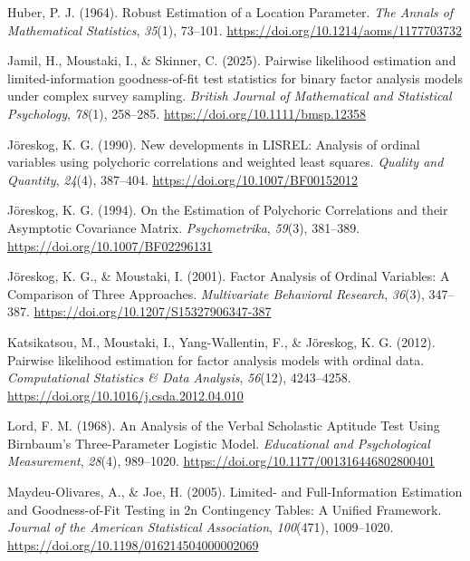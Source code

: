 \documentclass[
  letterpaper,
  DIV=11,
  numbers=noendperiod]{scrartcl}
\newlength{\cslhangindent}
\newenvironment{CSLReferences}[2] %
 {\begin{list}{}{%
  \setlength{\itemindent}{0pt}
  \setlength{\leftmargin}{0pt}
  \setlength{\parsep}{0pt}
  \ifodd #1
   \setlength{\leftmargin}{\cslhangindent}
   \setlength{\itemindent}{-1\cslhangindent}
  \fi
  \setlength{\itemsep}{#2\baselineskip}}}
 {\end{list}}
\begin{document}
\begin{CSLReferences}{1}{0}
Huber, P. J. (1964). Robust {Estimation} of a {Location Parameter}.
\emph{The Annals of Mathematical Statistics}, \emph{35}(1), 73--101.
\url{https://doi.org/10.1214/aoms/1177703732}

Jamil, H., Moustaki, I., \& Skinner, C. (2025). Pairwise likelihood
estimation and limited-information goodness-of-fit test statistics for
binary factor analysis models under complex survey sampling.
\emph{British Journal of Mathematical and Statistical Psychology},
\emph{78}(1), 258--285. \url{https://doi.org/10.1111/bmsp.12358}

Jöreskog, K. G. (1990). New developments in {LISREL}: Analysis of
ordinal variables using polychoric correlations and weighted least
squares. \emph{Quality and Quantity}, \emph{24}(4), 387--404.
\url{https://doi.org/10.1007/BF00152012}

Jöreskog, K. G. (1994). On the {Estimation} of {Polychoric Correlations}
and their {Asymptotic Covariance Matrix}. \emph{Psychometrika},
\emph{59}(3), 381--389. \url{https://doi.org/10.1007/BF02296131}

Jöreskog, K. G., \& Moustaki, I. (2001). Factor {Analysis} of {Ordinal
Variables}: {A Comparison} of {Three Approaches}. \emph{Multivariate
Behavioral Research}, \emph{36}(3), 347--387.
\url{https://doi.org/10.1207/S15327906347-387}

Katsikatsou, M., Moustaki, I., Yang-Wallentin, F., \& Jöreskog, K. G.
(2012). Pairwise likelihood estimation for factor analysis models with
ordinal data. \emph{Computational Statistics \& Data Analysis},
\emph{56}(12), 4243--4258.
\url{https://doi.org/10.1016/j.csda.2012.04.010}

Lord, F. M. (1968). An {Analysis} of the {Verbal Scholastic Aptitude
Test Using Birnbaum}'s {Three-Parameter Logistic Model}.
\emph{Educational and Psychological Measurement}, \emph{28}(4),
989--1020. \url{https://doi.org/10.1177/001316446802800401}

Maydeu-Olivares, A., \& Joe, H. (2005). Limited- and {Full-Information
Estimation} and {Goodness-of-Fit Testing} in 2n {Contingency Tables}: {A
Unified Framework}. \emph{Journal of the American Statistical
Association}, \emph{100}(471), 1009--1020.
\url{https://doi.org/10.1198/016214504000002069}


\end{CSLReferences}
\end{document}
